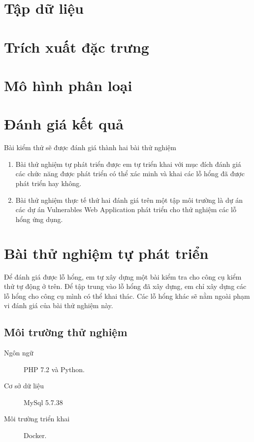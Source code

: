 \documentclass[./../main.tex]{subfiles}
\begin{document}
\section{Tập dữ liệu}
\section{Trích xuất đặc trưng}
\section{Mô hình phân loại}
\section{Đánh giá kết quả}

Bài kiểm thử sẽ được đánh giá thành hai bài thử nghiệm
\begin{enumerate}
	\item Bài thử nghiệm tự phát triển được em tự triển khai với mục đích đánh
	      giá các chức năng được phát triển có thể xác minh và khai các lỗ hổng
	      đã được phát triển hay không.
	\item Bài thử nghiệm thực tế thứ hai đánh giá trên một tập môi trường là dự án các dự án Vulnerables Web Application phát triển cho thử nghiệm các lỗ hổng ứng dụng.
\end{enumerate}

\section{Bài thử nghiệm tự phát triển}

Để đánh giá được lỗ hổng, em tự xây dựng một bài kiểm tra cho công cụ kiểm thử tự động ở trên. Để tập trung vào lỗ hổng đã xây dựng, em chỉ xây dựng các lỗ hổng cho công cụ mình có thể khai thác. Các lỗ hổng khác sẽ nằm ngoài phạm vi đánh giá của bài thử nghiệm này.

\subsection{Môi trường thử nghiệm}

\begin{description}
	\item[Ngôn ngữ] PHP 7.2 và Python.
	\item [Cơ sở dữ liệu] MySql 5.7.38
	\item [Môi trường triển khai] Docker.
\end{description}
\end{document}
